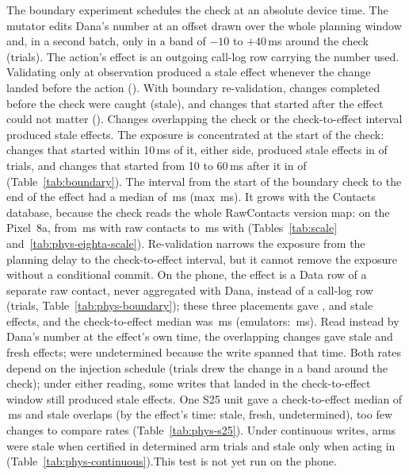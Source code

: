 The boundary experiment schedules the check at an absolute device time. The mutator edits Dana's number at an offset drawn over the whole planning window and, in a second batch, only in a band of $-10$ to $+40$\,ms around the check (\EThreeTrials trials). The action's effect is an outgoing call-log row carrying the number used. Validating only at observation produced a stale effect whenever the change landed before the action (\BndObsBeforeAction). With boundary re-validation, changes completed before the check were caught (\BndBndBeforeCheck stale), and changes that started after the effect could not matter (\BndBndAfterEffect). Changes overlapping the check or the check-to-effect interval produced \BndBndOverlapsCheckOrResidual stale effects. The exposure is concentrated at the start of the check: changes that started within 10\,ms of it, either side, produced stale effects in \BinEarlyK of \BinEarlyN trials, and changes that started from 10 to 60\,ms after it in \BinLateK of \BinLateN (Table~\ref{tab:boundary}). The interval from the start of the boundary check to the end of the effect had a median of \CteMs\,ms (max \CteMax\,ms). It grows with the Contacts database, because the check reads the whole RawContacts version map: on the Pixel~8a, from \PhysEightAScaleZeroCte\,ms with \PhysEightAScaleZeroRaw raw contacts to \PhysEightAScaleTenKCte\,ms with \PhysEightAScaleTenKRaw (Tables~\ref{tab:scale} and~\ref{tab:phys-eighta-scale}). Re-validation narrows the exposure from the planning delay to the check-to-effect interval, but it cannot remove the exposure without a conditional commit. \ifPhysBoundary On the phone, the effect is a Data row of a separate raw contact, never aggregated with Dana, instead of a call-log row (\PhysBoundaryTrials trials, Table~\ref{tab:phys-boundary}); these three placements gave \PhysBndObsStale, \PhysBndBeforeCheckStale and \PhysBndOverlapStale stale effects, and the check-to-effect median was \PhysCteMs\,ms (emulators: \CteMs\,ms). Read instead by Dana's number at the effect's own time, the overlapping changes gave \PhysBndOverlapWallStale stale and \PhysBndOverlapWallFresh fresh effects; \PhysBndOverlapWallUndet were undetermined because the write spanned that time. Both rates depend on the injection schedule (\PhysBndBandTrials trials drew the change in a band around the check); under either reading, some writes that landed in the check-to-effect window still produced stale effects.\ifPhysSamsung{} One S25 unit gave a check-to-effect median of \PhysSamsungCteMs\,ms and \PhysSamsungBndOverlapStale stale overlaps (by the effect's time: \PhysSamsungBndOverlapWallStale stale, \PhysSamsungBndOverlapWallFresh fresh, \PhysSamsungBndOverlapWallUndet undetermined), too few changes to compare rates (Table~\ref{tab:phys-s25}).\fi\ifPhysCont{} Under continuous writes, arms were stale when certified in \PhysContStaleCert determined arm trials and stale only when acting in \PhysContActionOnly (Table~\ref{tab:phys-continuous}).\fi\else This test is not yet run on the phone.\fi

